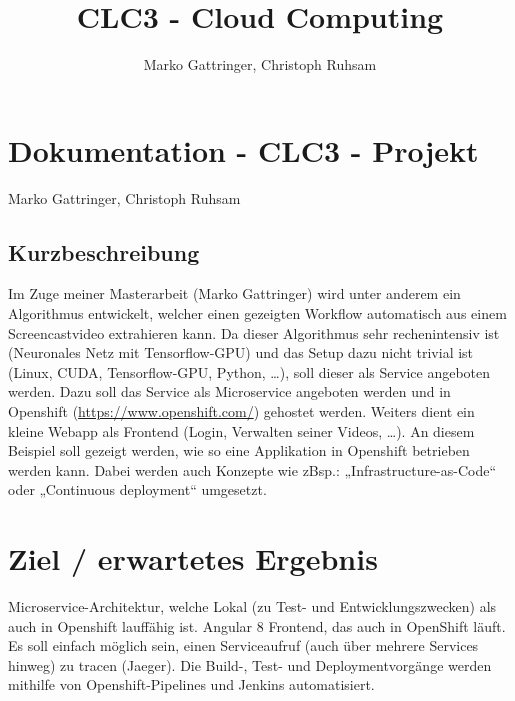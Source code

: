 \documentclass[11pt, a4paper]{article}   	%
\title{CLC3 - Cloud Computing}
\author{Marko Gattringer, Christoph Ruhsam}
\begin{document}
\section{Dokumentation - CLC3 - Projekt}
Marko Gattringer, Christoph Ruhsam

\subsection{Kurzbeschreibung}
Im Zuge meiner Masterarbeit (Marko Gattringer) wird unter anderem ein Algorithmus entwickelt, welcher einen gezeigten Workflow automatisch aus einem Screencastvideo extrahieren kann. Da dieser Algorithmus sehr rechenintensiv ist (Neuronales Netz mit Tensorflow-GPU) und das Setup dazu nicht trivial ist (Linux, CUDA, Tensorflow-GPU, Python, …), soll dieser als Service angeboten werden. Dazu soll das Service als Microservice angeboten werden und in Openshift (\href{https://www.openshift.com/}{https://www.openshift.com/}) gehostet werden. Weiters dient ein kleine Webapp als Frontend (Login, Verwalten seiner Videos, …). An diesem Beispiel soll gezeigt werden, wie so eine Applikation in Openshift betrieben werden kann. Dabei werden auch Konzepte wie zBsp.: „Infrastructure-as-Code“ oder „Continuous deployment“ umgesetzt.

\section{Ziel / erwartetes Ergebnis}
Microservice-Architektur, welche Lokal (zu Test- und Entwicklungszwecken) als auch in Openshift lauffähig ist.
Angular 8 Frontend, das auch in OpenShift läuft.
Es soll einfach möglich sein, einen Serviceaufruf (auch über mehrere Services hinweg) zu tracen (Jaeger).
Die Build-, Test- und Deploymentvorgänge werden mithilfe von Openshift-Pipelines und Jenkins automatisiert.
\end{document}
